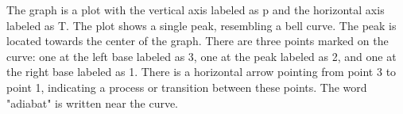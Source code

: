 The graph is a plot with the vertical axis labeled as p and the horizontal axis labeled as T. The plot shows a single peak, resembling a bell curve. The peak is located towards the center of the graph. There are three points marked on the curve: one at the left base labeled as 3, one at the peak labeled as 2, and one at the right base labeled as 1. There is a horizontal arrow pointing from point 3 to point 1, indicating a process or transition between these points. The word "adiabat" is written near the curve.